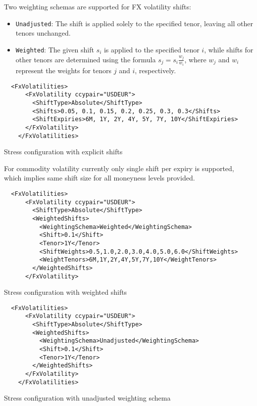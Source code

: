 Two weighting schemas are supported for FX volatility shifts: 
\begin{itemize} 
\item {\tt Unadjusted}: The shift is applied solely to the specified tenor, leaving all other tenors unchanged. 
\item {\tt Weighted}: The given shift $s_i$ is applied to the specified tenor $i$, while shifts for other tenors are determined using the formula $s_j = s_i \frac{w_j}{w_i}$, where $w_j$ and $w_i$ represent the weights for tenors $j$ and $i$, respectively. 
\end{itemize}

\begin{listing}
\begin{verbatim}
  <FxVolatilities>
      <FxVolatility ccypair="USDEUR">
        <ShiftType>Absolute</ShiftType>
        <Shifts>0.05, 0.1, 0.15, 0.2, 0.25, 0.3, 0.3</Shifts>
        <ShiftExpiries>6M, 1Y, 2Y, 4Y, 5Y, 7Y, 10Y</ShiftExpiries>
      </FxVolatility>
    </FxVolatilities>
\end{verbatim}
\caption{Stress configuration with explicit shifts}
\label{lst:stress_config_fxvol_explicit}
\end{listing}

For commodity volatility currently only single shift per expiry is supported, which implies same shift size for all moneyness levels provided.

\begin{listing}
\begin{verbatim}
  <FxVolatilities>
      <FxVolatility ccypair="USDEUR">
        <ShiftType>Absolute</ShiftType>
        <WeightedShifts>
          <WeightingSchema>Weighted</WeightingSchema>
          <Shift>0.1</Shift>
          <Tenor>1Y</Tenor>
          <ShiftWeights>0.5,1.0,2.0,3.0,4.0,5.0,6.0</ShiftWeights>
          <WeightTenors>6M,1Y,2Y,4Y,5Y,7Y,10Y</WeightTenors>
        </WeightedShifts>
      </FxVolatility>
\end{verbatim}
\caption{Stress configuration with weighted shifts}
\label{lst:stress_config_fxvol_weighting}
\end{listing}

\begin{listing}
\begin{verbatim}
  <FxVolatilities>
      <FxVolatility ccypair="USDEUR">
        <ShiftType>Absolute</ShiftType>
        <WeightedShifts>
          <WeightingSchema>Unadjusted</WeightingSchema>
          <Shift>0.1</Shift>
          <Tenor>1Y</Tenor>
        </WeightedShifts>
      </FxVolatility>
    </FxVolatilities>
\end{verbatim}
\caption{Stress configuration with unadjusted weighting schema}
\label{lst:stress_config_fxvol_weighting_off}
\end{listing}

